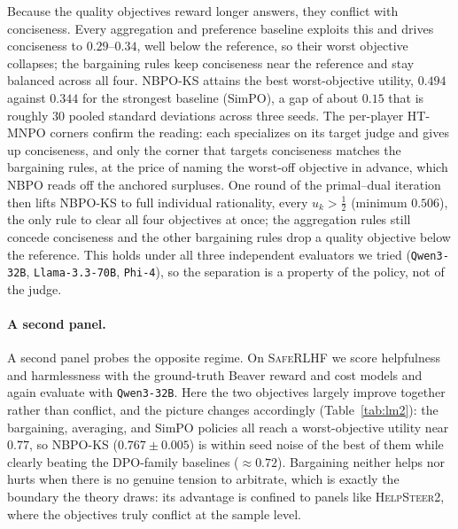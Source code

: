 \documentclass[letterpaper]{article} %
\begin{document}
Because the quality objectives reward longer answers, they conflict with conciseness. Every aggregation and preference baseline exploits this and drives conciseness to $0.29$--$0.34$, well below the reference, so their worst objective collapses; the bargaining rules keep conciseness near the reference and stay balanced across all four. NBPO-KS attains the best worst-objective utility, $0.494$ against $0.344$ for the strongest baseline (SimPO), a gap of about $0.15$ that is roughly $30$ pooled standard deviations across three seeds. The per-player HT-MNPO corners confirm the reading: each specializes on its target judge and gives up conciseness, and only the corner that targets conciseness matches the bargaining rules, at the price of naming the worst-off objective in advance, which NBPO reads off the anchored surpluses. One round of the primal--dual iteration then lifts NBPO-KS to full individual rationality, every $u_k>\tfrac12$ (minimum $0.506$), the only rule to clear all four objectives at once; the aggregation rules still concede conciseness and the other bargaining rules drop a quality objective below the reference. This holds under all three independent evaluators we tried (\texttt{Qwen3-32B}, \texttt{Llama-3.3-70B}, \texttt{Phi-4}), so the separation is a property of the policy, not of the judge.

\paragraph{A second panel.}
A second panel probes the opposite regime. On \textsc{SafeRLHF} \citep{dai2024safe} we score helpfulness and harmlessness with the ground-truth Beaver reward and cost models and again evaluate with \texttt{Qwen3-32B}. Here the two objectives largely improve together rather than conflict, and the picture changes accordingly (Table~\ref{tab:lm2}): the bargaining, averaging, and SimPO policies all reach a worst-objective utility near $0.77$, so NBPO-KS ($0.767\pm0.005$) is within seed noise of the best of them while clearly beating the DPO-family baselines ($\approx0.72$). Bargaining neither helps nor hurts when there is no genuine tension to arbitrate, which is exactly the boundary the theory draws: its advantage is confined to panels like \textsc{HelpSteer2}, where the objectives truly conflict at the sample level.
\end{document}
